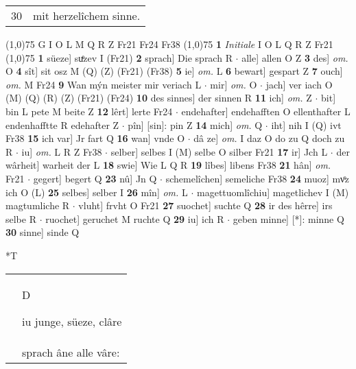 \documentclass[8pt,a4paper,notitlepage]{article}
\begin{document}
\begin{table}[ht]
\begin{minipage}[t]{0.5\linewidth}
\begin{tabular}{rl}
30 & mit herzelîchem sinne.\\ 
\end{tabular}
\scriptsize
\line(1,0){75} \newline
G I O L M Q R Z Fr21 Fr24 Fr38 \newline
\line(1,0){75} \newline
\textbf{1} \textit{Initiale} I O L Q R Z Fr21  \newline
\line(1,0){75} \newline
\textbf{1} süeze] suͤzev I (Fr21) \textbf{2} sprach] Die sprach R  $\cdot$ alle] allen O Z \textbf{3} des] \textit{om.} O \textbf{4} sît] sit osz M (Q) (Z) (Fr21) (Fr38) \textbf{5} ie] \textit{om.} L \textbf{6} bewart] gespart Z \textbf{7} ouch] \textit{om.} M Fr24 \textbf{9} Wan mýn meister mir veriach L  $\cdot$ mir] \textit{om.} O  $\cdot$ jach] ver iach O (M) (Q) (R) (Z) (Fr21) (Fr24) \textbf{10} des sinnes] der sinnen R \textbf{11} ich] \textit{om.} Z  $\cdot$ bit] bin L pete M beite Z \textbf{12} lêrt] lerte Fr24  $\cdot$ endehafter] endehafften O ellenthafter L endenhafftte R edehafter Z  $\cdot$ pîn] [sin]: pin Z \textbf{14} mich] \textit{om.} Q  $\cdot$ iht] nih I (Q) ivt Fr38 \textbf{15} ich var] Jr fart Q \textbf{16} wan] vnde O  $\cdot$ dâ ze] \textit{om.} I daz O do zu Q doch zu R  $\cdot$ iu] \textit{om.} L R Z Fr38  $\cdot$ selber] selbes I (M) selbe O silber Fr21 \textbf{17} ir] Jch L  $\cdot$ der wârheit] warheit der L \textbf{18} swie] Wie L Q R \textbf{19} lîbes] libens Fr38 \textbf{21} hân] \textit{om.} Fr21  $\cdot$ gegert] begert Q \textbf{23} nû] Jn Q  $\cdot$ schemelîchen] semeliche Fr38 \textbf{24} muoz] mvͦz ich O (L) \textbf{25} selbes] selber I \textbf{26} mîn] \textit{om.} L  $\cdot$ magettuomlîchiu] magetlichev I (M) magtumliche R  $\cdot$ vluht] frvht O Fr21 \textbf{27} suochet] suchte Q \textbf{28} ir des hêrre] irs selbe R  $\cdot$ ruochet] geruchet M ruchte Q \textbf{29} iu] ich R  $\cdot$ geben minne] [*]: minne Q \textbf{30} sinne] sinde Q \newline
\end{minipage}
\hspace{0.5cm}
\begin{minipage}[t]{0.5\linewidth}
\small
\begin{center}*T
\end{center}
\begin{tabular}{rl}
 & \begin{large}D\end{large}iu junge, süeze, clâre\\ 
 & sprach âne alle vâre:\\ 

\end{tabular}
\end{minipage}
\end{table}
\end{document}
